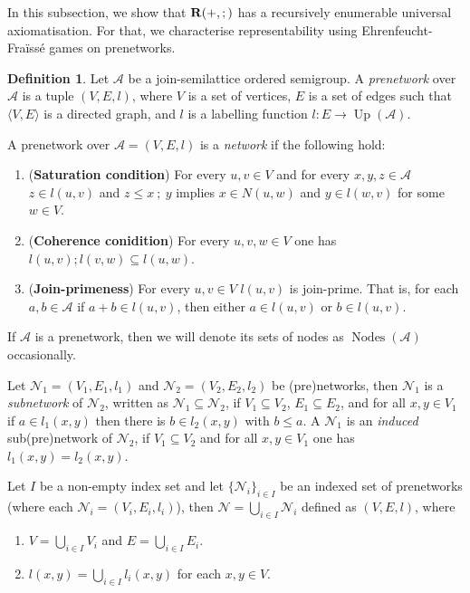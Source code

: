 \documentclass[a4paper]{article}
\theoremstyle{definition}
\newtheorem{definition}{Definition}
\theoremstyle{theorem}
\theoremstyle{proposition}
\theoremstyle{lemma}
\theoremstyle{ex}
\theoremstyle{corollary}
\theoremstyle{claim}
\begin{document}
In this subsection, we show that ${\bf R}(+, ;)$ has a recursively enumerable universal axiomatisation. For that, we characterise representability using Ehrenfeucht-Fra\"{i}ss\'{e} games on prenetworks.

\begin{definition} Let $\mathcal{A}$ be a join-semilattice ordered semigroup. A \emph{prenetwork} over $\mathcal{A}$ is a tuple $(V, E, l)$, where $V$ is a set of vertices, $E$ is a set of edges such that $\langle V, E \rangle$ is a directed graph, and $l$ is a labelling function $l : E \to \operatorname{Up}(\mathcal{A})$.

  A prenetwork over $\mathcal{A} = (V, E, l)$ is a \emph{network} if the following hold:
  \begin{enumerate}
    \item ({\bf Saturation condition}) For every $u, v \in V$ and for every $x,y,z \in \mathcal{A}$ $z \in l(u, v)$ and $z \leq x \: ; \: y$ implies $x \in N(u, w)$ and $y \in l(w, v)$ for some $w \in V$.
    \item ({\bf Coherence conidition}) For every $u, v, w \in V$ one has $l(u, v) ; l(v, w) \subseteq l(u, w)$.
    \item ({\bf Join-primeness}) For every $u, v \in V$ $l(u,v)$ is join-prime. That is, for each $a, b \in \mathcal{A}$ if $a + b \in l(u,v)$, then either $a \in l(u,v)$ or $b \in l(u,v)$.
  \end{enumerate}
\end{definition}

If $\mathcal{A}$ is a prenetwork, then we will denote its sets of nodes as $\operatorname{Nodes}(\mathcal{A})$ occasionally.

Let $\mathcal{N}_1 = (V_1, E_1, l_1)$ and $\mathcal{N}_2 = (V_2, E_2, l_2)$ be (pre)networks, then $\mathcal{N}_1$ is a \emph{subnetwork} of $\mathcal{N}_2$, written as $\mathcal{N}_1 \subseteq \mathcal{N}_2$,
if $V_1 \subseteq V_2$, $E_1 \subseteq E_2$, and for all $x, y \in V_1$ if $a \in l_1(x, y)$ then there is $b \in l_2(x, y)$ with $b \leq a$. A $\mathcal{N}_1$ is an \emph{induced} sub(pre)network of $\mathcal{N}_2$, if $V_1 \subseteq V_2$ and for all $x, y \in V_1$ one has $l_1(x,y) = l_2(x,y)$.

Let $I$ be a non-empty index set and let $\{ \mathcal{N}_i \}_{i \in I}$ be an indexed set of prenetworks (where each $\mathcal{N}_i = (V_i, E_i, l_i)$), then $\mathcal{N} = \bigcup \limits_{i \in I} \mathcal{N}_i$ defined as $(V, E, l)$, where

\begin{enumerate}
  \item $V = \bigcup \limits_{i \in I} V_i$ and $E = \bigcup \limits_{i \in I} E_i$.
  \item $l(x, y) = \bigcup \limits_{ i \in I } l_i(x, y)$ for each $x, y \in V$.
\end{enumerate}
\end{document}
